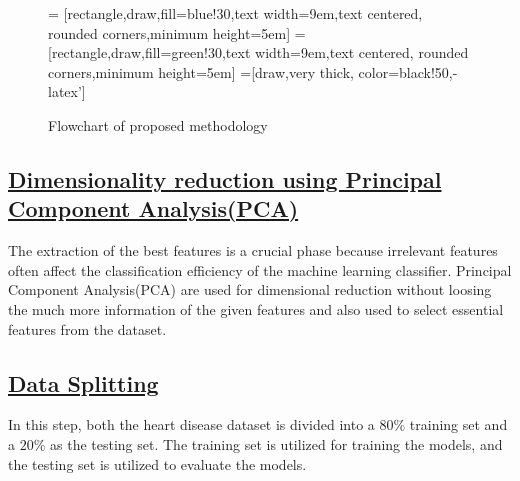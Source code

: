 \documentclass[11pt]{article}
\begin{document}
\vspace{1cm}
\begin{figure}


= [rectangle,draw,fill=blue!30,text width=9em,text centered, rounded corners,minimum height=5em]
= [rectangle,draw,fill=green!30,text width=9em,text centered, rounded corners,minimum height=5em]
=[draw,very thick, color=black!50,-latex']
\centering
{}
\caption{Flowchart of proposed methodology}
\label{fig:fig11}
\end{figure}
\subsection{\underline{Dimensionality reduction using Principal Component Analysis(PCA)}}
The extraction of the best
features is a crucial phase because irrelevant features often
affect the classification efficiency of the machine learning
classifier. Principal Component Analysis(PCA) are used for dimensional reduction without loosing the much more information of the given features and also used to select essential features from the dataset.
\subsection{\underline{Data Splitting}}
In this step, both the heart disease dataset is divided into a $80\%$ training set and a $20\%$ as the testing set.
The training set is utilized for training the models, and the
testing set is utilized to evaluate the models.
\end{document}
